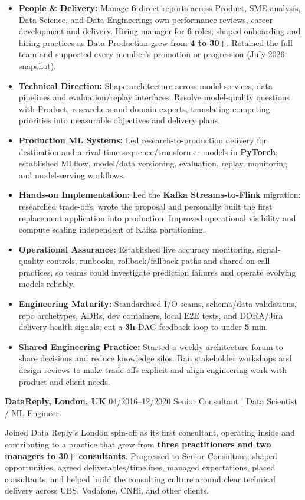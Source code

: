 \documentclass[]{../../../../friggeri-cv}
\renewcommand{\entry}[4]{%
  \parbox[t]{\dimexpr\textwidth-\entryleftinset\relax}{%
    \textbf{#2}%
    {\footnotesize\addfontfeature{Color=lightgray}\hspace{0.6em}#1}%
    \hfill%
    {\small\color{textcolor} #3}\\%
    #4\vspace{\parsep}%
  }\\}
\begin{document}
\begin{entrylist}
{{        }
        \begin{itemize}[leftmargin=1.1em]
            \item \footnotesize\textbf{People \& Delivery:} Manage \textbf{6} direct reports across Product, SME analysis, Data Science, and Data Engineering; own performance reviews, career development and delivery. Hiring manager for \textbf{6} roles; shaped onboarding and hiring practices as Data Production grew from \textbf{4 to 30+}. Retained the full team and supported every member's promotion or progression (July 2026 snapshot).
            \item \footnotesize\textbf{Technical Direction:} Shape architecture across model services, data pipelines and evaluation/replay interfaces. Resolve model-quality questions with Product, researchers and domain experts, translating competing priorities into measurable objectives and delivery plans.
            \item \footnotesize\textbf{Production ML Systems:} Led research-to-production delivery for destination and arrival-time sequence/transformer models in \textbf{PyTorch}; established MLflow, model/data versioning, evaluation, replay, monitoring and model-serving workflows.
            \item \footnotesize\textbf{Hands-on Implementation:} Led the \textbf{Kafka Streams-to-Flink} migration: researched trade-offs, wrote the proposal and personally built the first replacement application into production. Improved operational visibility and compute scaling independent of Kafka partitioning.
            \item \footnotesize\textbf{Operational Assurance:} Established live accuracy monitoring, signal-quality controls, runbooks, rollback/fallback paths and shared on-call practices, so teams could investigate prediction failures and operate evolving models reliably.
            \item \footnotesize\textbf{Engineering Maturity:} Standardised I/O seams, schema/data validations, repo archetypes, ADRs, dev containers, local E2E tests, and DORA/Jira delivery-health signals; cut a \textbf{3h} DAG feedback loop to under \textbf{5} min.
            \item \footnotesize\textbf{Shared Engineering Practice:} Started a weekly architecture forum to share decisions and reduce knowledge silos. Ran stakeholder workshops and design reviews to make trade-offs explicit and align engineering work with product and client needs.
        \end{itemize}
    }
    \entry
    {04/2016--12/2020}
    {DataReply, London, UK}
    {Senior Consultant | Data Scientist / ML Engineer}
    {
        {\small
        \setlength{\parindent}{0pt}
        \setlength{\leftskip}{0pt}
        Joined Data Reply's London spin-off as its first consultant, operating inside and contributing to a practice that grew from \textbf{three practitioners and two managers to 30+ consultants}. Progressed to Senior Consultant; shaped opportunities, agreed deliverables/timelines, managed expectations, placed consultants, and helped build the consulting culture around clear technical delivery across UBS, Vodafone, CNHi, and other clients.

}}
\end{entrylist}
\end{document}
